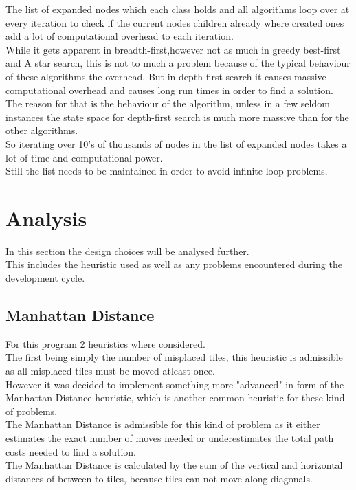 \documentclass[journal]{IEEEtran}
\begin{document}
The list of expanded nodes which each class holds and all algorithms loop over at every iteration to check if the current nodes children already where created ones add a lot of computational overhead to each iteration. \\
While it gets apparent in breadth-first,however not as much in greedy best-first and A star search, this is not to much a problem because of the typical behaviour of these algorithms the overhead. But in depth-first search it causes massive computational overhead and causes long run times in order to find a solution. \\
The reason for that is the behaviour of the algorithm, unless in a few seldom instances the state space for depth-first search is much more massive than for the other algorithms. \\
So iterating over 10's of thousands of nodes in the list of expanded nodes takes a lot of time and computational power. \\
Still the list needs to be maintained in order to avoid infinite loop problems.


\section{Analysis}\label{sec:analysis}
In this section the design choices will be analysed further. \\
This includes the heuristic used as well as any problems encountered during the development cycle. \\

\subsection{Manhattan Distance}
For this program 2 heuristics where considered.\\
The first being simply the number of misplaced tiles, this heuristic is admissible as all misplaced tiles must be moved atleast once. \\
However it was decided to implement something more "advanced" in form of the Manhattan Distance heuristic, which is another common heuristic for these kind of problems\cite{russell2009artificial}. \\
The Manhattan Distance is admissible for this kind of problem as it either estimates the exact number of moves needed or underestimates the total path costs needed to find a solution. \\
The Manhattan Distance is calculated by the sum of the vertical and horizontal distances of between to tiles, because tiles can not move along diagonals. \\
\end{document}
